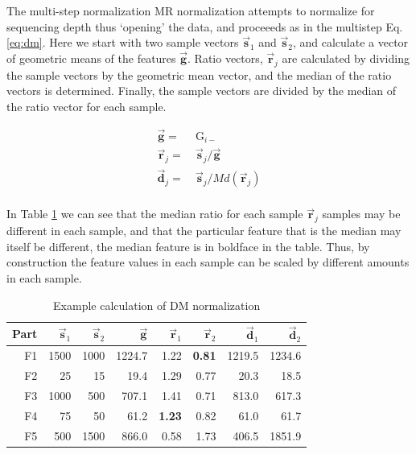 \documentclass[twocolumn]{article}
\begin{document}
The multi-step normalization MR normalization attempts to normalize for
sequencing depth thus `opening' the data, and proceeeds as in the
multistep Eq. \ref{eq:dm}. Here we start with two sample vectors
\(\vec{\textbf{s}}_1\) and \(\vec{\textbf{s}}_2\), and calculate a
vector of geometric means of the features \(\vec{\textbf{g}}\). Ratio
vectors, \(\vec{\textbf{r}}_j\) are calculated by dividing the sample
vectors by the geometric mean vector, and the median of the ratio
vectors is determined. Finally, the sample vectors are divided by the
median of the ratio vector for each sample.

\begin{equation}
    \begin{aligned}
        \vec{\textbf{g}} = &\ \mathrm{G}_{i-}\\
        \vec{\textbf{r}}_j = &\ \vec{\textbf{s}}_j / \vec{\textbf{g}}\\
        \vec{\textbf{d}}_j = &\ \vec{\textbf{s}}_j / Md(\vec{\textbf{r}}_j)\\
    \end{aligned}
\label{eq:dm}
\end{equation}

In Table \ref{tab:des} we can see that the median ratio for each sample
\(\vec{\textbf{r}}_j\) samples may be different in each sample, and that
the particular feature that is the median may itself be different, the
median feature is in boldface in the table. Thus, by construction the
feature values in each sample can be scaled by different amounts in each
sample.

\begin{table}[!h]
\caption{Example calculation of DM normalization}
\centering
\begin{tabular}{r r r r r r r r}
\hline
Part & $\vec{\textbf{s}}_1$ & $\vec{\textbf{s}}_2$ & $\vec{\textbf{g}}$ & $\vec{\textbf{r}}_1$ & $\vec{\textbf{r}}_2$ & $\vec{\textbf{d}}_1$ & $\vec{\textbf{d}}_2$ \\ \hline \hline
F1 & 1500 & 1000 & 1224.7 & 1.22 & {\bf 0.81} & 1219.5 & 1234.6\\
F2 & 25 & 15 & 19.4 & 1.29 & 0.77 & 20.3 & 18.5 \\
F3 & 1000 & 500 & 707.1 & 1.41 & 0.71 & 813.0 & 617.3 \\
F4 & 75 & 50 & 61.2 & {\bf 1.23} &  0.82 & 61.0 & 61.7 \\
F5 & 500 & 1500 & 866.0 & 0.58 & 1.73 & 406.5 & 1851.9\\ \hline
\end{tabular}
\label{tab:des}
\end{table}
\end{document}
